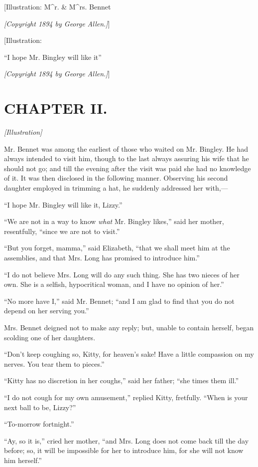 \documentclass[12pt]{book}
\begin{document}
[Illustration: M^{r.} & M^{rs.} Bennet

\emph{[\textit{Copyright 1894 by George Allen.}]}]

[Illustration:

``I hope Mr. Bingley will like it''

\emph{[\textit{Copyright 1894 by George Allen.}]}]

\chapter{CHAPTER II.}

\emph{[Illustration]}

Mr. Bennet was among the earliest of those who waited on Mr. Bingley. He had always intended to visit him, though to the last always assuring his wife that he should not go; and till the evening after the visit was paid she had no knowledge of it. It was then disclosed in the following manner. Observing his second daughter employed in trimming a hat, he suddenly addressed her with,---

``I hope Mr. Bingley will like it, Lizzy.''

``We are not in a way to know \textit{what} Mr. Bingley likes,'' said her mother, resentfully, ``since we are not to visit.''

``But you forget, mamma,'' said Elizabeth, ``that we shall meet him at the assemblies, and that Mrs. Long has promised to introduce him.''

``I do not believe Mrs. Long will do any such thing. She has two nieces of her own. She is a selfish, hypocritical woman, and I have no opinion of her.''

``No more have I,'' said Mr. Bennet; ``and I am glad to find that you do not depend on her serving you.''

Mrs. Bennet deigned not to make any reply; but, unable to contain herself, began scolding one of her daughters.

``Don't keep coughing so, Kitty, for heaven's sake! Have a little compassion on my nerves. You tear them to pieces.''

``Kitty has no discretion in her coughs,'' said her father; ``she times them ill.''

``I do not cough for my own amusement,'' replied Kitty, fretfully. ``When is your next ball to be, Lizzy?''

``To-morrow fortnight.''

``Ay, so it is,'' cried her mother, ``and Mrs. Long does not come back till the day before; so, it will be impossible for her to introduce him, for she will not know him herself.''
\end{document}
